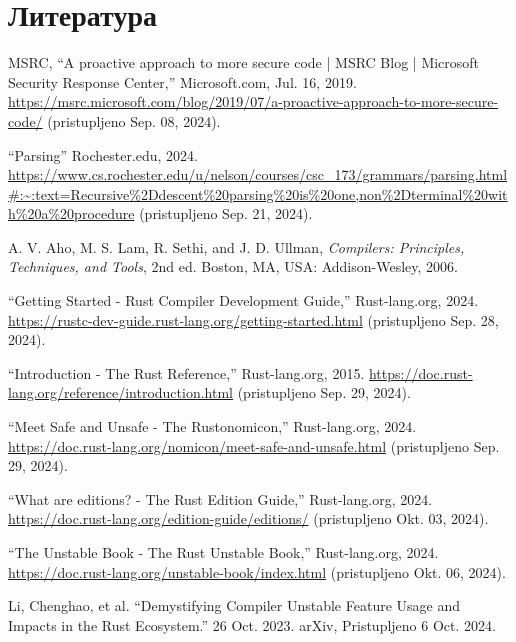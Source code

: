 \section{Литература}

\renewcommand{\refname}{}  %
\renewcommand{\bibname}{}  %
\vspace*{-2em}             %

\begin{thebibliography}
    \raggedright
{} 
    MSRC, “A proactive approach to more secure code | MSRC Blog | 
    Microsoft Security Response Center,” Microsoft.com, Jul. 16, 2019. 
    \url{https://msrc.microsoft.com/blog/2019/07/a-proactive-approach-to-more-secure-code/} 
    (pristupljeno Sep. 08, 2024).

    “Parsing” Rochester.edu, 2024.
    \url{https://www.cs.rochester.edu/u/nelson/courses/csc_173/grammars/parsing.html#:~:text=Recursive%2Ddescent%20parsing%20is%20one,non%2Dterminal%20with%20a%20procedure} 
    (pristupljeno Sep. 21, 2024).

    A. V. Aho, M. S. Lam, R. Sethi, and J. D. Ullman, \emph{Compilers: Principles, Techniques, and Tools}, 2nd ed. Boston, MA, USA: Addison-Wesley, 2006.

    “Getting Started - Rust Compiler Development Guide,” Rust-lang.org, 2024. 
    \url{https://rustc-dev-guide.rust-lang.org/getting-started.html} (pristupljeno Sep. 28, 2024).

    “Introduction - The Rust Reference,” Rust-lang.org, 2015. 
    \url{https://doc.rust-lang.org/reference/introduction.html} (pristupljeno Sep. 29, 2024).
    
    “Meet Safe and Unsafe - The Rustonomicon,” Rust-lang.org, 2024. 
    \url{https://doc.rust-lang.org/nomicon/meet-safe-and-unsafe.html} (pristupljeno Sep. 29, 2024).

    “What are editions? - The Rust Edition Guide,” Rust-lang.org, 2024.
    \url{https://doc.rust-lang.org/edition-guide/editions/} (pristupljeno Okt. 03, 2024).

    “The Unstable Book - The Rust Unstable Book,” Rust-lang.org, 2024. 
    \url{https://doc.rust-lang.org/unstable-book/index.html} (pristupljeno Okt. 06, 2024).

    Li, Chenghao, et al. “Demystifying Compiler Unstable Feature Usage and Impacts in the Rust Ecosystem.” 26 Oct. 2023. arXiv, Pristupljeno 6 Oct. 2024. 


\end{thebibliography}
